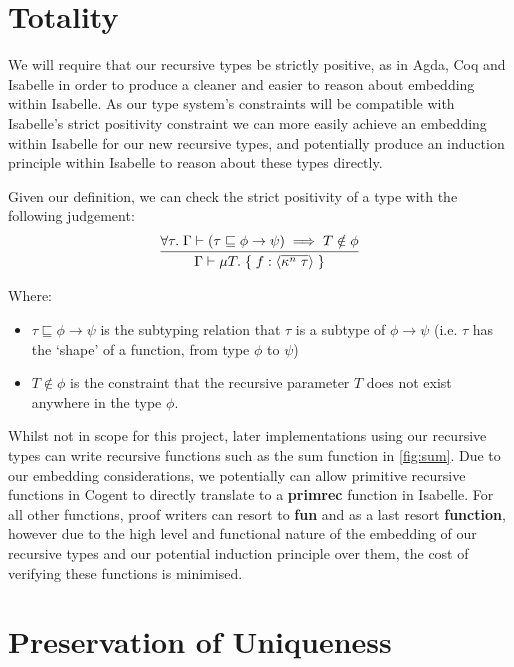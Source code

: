 \FloatBarrier

\section{Totality}

We will require that our recursive types be strictly positive, as in Agda,
Coq and Isabelle in order to produce a cleaner and easier to reason about
embedding within Isabelle. As our type system's constraints will be compatible with Isabelle's
strict positivity constraint we can more easily achieve an embedding within Isabelle for our new
recursive types, and potentially produce an induction principle within Isabelle to reason
about these types directly.

Given our definition, we can check the strict positivity of a type with the following judgement:
$$
\infer{
    \Gamma \vdash \mu T.\; \{\; f: \langle \overline{\kappa^n\; \tau} \rangle\; \}
}{
   \forall \tau.\; \Gamma \vdash (\tau \sqsubseteq \phi \rightarrow \psi) \implies T \notin \phi
}
$$

Where:
\begin{itemize}
    \item 
        $\tau \sqsubseteq \phi \rightarrow \psi$ is the subtyping relation that $\tau$ 
        is a subtype of $\phi \rightarrow \psi$ 
        (i.e. $\tau$ has the `shape' of a function, from type $\phi$ to $\psi$) 
    \item
        $T \notin \phi$ is the constraint that the recursive parameter $T$ 
        does not exist anywhere in the type $\phi$.
\end{itemize}

Whilst not in scope for this project, later implementations using our recursive types can
write recursive functions such as the sum function in \autoref{fig:sum}. Due to our embedding
considerations, we potentially can allow primitive recursive functions in Cogent to 
directly translate to a \textbf{primrec} function in Isabelle. For all other functions,
proof writers can resort to \textbf{fun} and as a last resort \textbf{function}, however
due to the high level and functional nature of the embedding of our recursive types
and our potential induction principle over them, the cost of verifying these functions
is minimised.

\section{Preservation of Uniqueness}

